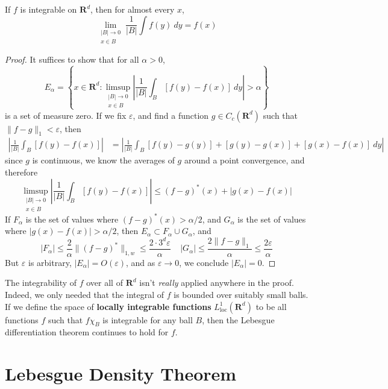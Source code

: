 \begin{theorem}
    If $f$ is integrable on $\mathbf{R}^d$, then for almost every $x$,
    \[ \lim_{\substack{|B| \to 0\\x \in B}} \frac{1}{|B|} \int f(y)\ dy = f(x) \]
\end{theorem}
\begin{proof}
    It suffices to show that for all $\alpha > 0$,
    \[ E_\alpha = \left\{ x \in \mathbf{R}^d: \limsup_{\substack{|B| \to 0\\x \in B}} \left| \frac{1}{|B|} \int_B [f(y) - f(x)]\ dy \right| > \alpha \right\} \]
    is a set of measure zero. If we fix $\varepsilon$, and find a function $g \in C_c(\mathbf{R}^d)$ such that $\| f - g \|_1 < \varepsilon$, then
    \begin{align*}
        \left| \frac{1}{|B|} \int_B [f(y) - f(x)] \right| &= \left| \frac{1}{|B|} \int_B [f(y) - g(y)] + [g(y) - g(x)] + [g(x) - f(x)]\ dy \right|
    \end{align*}
    since $g$ is continuous, we know the averages of $g$ around a point convergence, and therefore
    \[ \limsup_{\substack{|B| \to 0\\ x \in B}} \left| \frac{1}{|B|} \int_B [f(y) - f(x)] \right| \leq (f - g)^*(x) + |g(x) - f(x)| \]
    If $F_\alpha$ is the set of values where $(f - g)^*(x) > \alpha/2$, and $G_\alpha$ is the set of values where $|g(x) - f(x)| > \alpha / 2$, then $E_\alpha \subset F_\alpha \cup G_\alpha$, and
    \[ |F_\alpha| \leq \frac{2}{\alpha} \| (f - g)^* \|_{1,w} \leq \frac{2 \cdot 3^d \varepsilon}{\alpha} \ \ \ \ \ |G_\alpha| \leq \frac{2 \| f - g \|_1}{\alpha} \leq \frac{2 \varepsilon}{\alpha} \]
    But $\varepsilon$ is arbitrary, $|E_\alpha| = O(\varepsilon)$, and as $\varepsilon \to 0$, we conclude $|E_\alpha| = 0$.
\end{proof}

The integrability of $f$ over all of $\mathbf{R}^d$ isn't {\it really} applied anywhere in the proof. Indeed, we only needed that the integral of $f$ is bounded over suitably small balls. If we define the space of {\bf locally integrable functions} $L^1_{\text{loc}}(\mathbf{R}^d)$ to be all functions $f$ such that $f \chi_B$ is integrable for any ball $B$, then the Lebesgue differentiation theorem continues to hold for $f$.

\section{Lebesgue Density Theorem}

